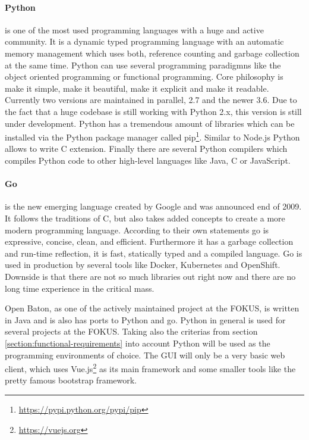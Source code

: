 \paragraph{Python} is one of the most used programming languages with a huge and active community.\autocite[cf.]{ProgramminLanguage:2017}
It is a dynamic typed programming language with an automatic memory management which uses both, reference counting and garbage collection at the same time.\autocite[cf.]{Python:GarbageCollection}
Python can use several programming paradigmns like the object oriented programming or functional programming.
Core philosophy is make it simple, make it beautiful, make it explicit and make it readable.
Currently two versions are maintained in parallel, 2.7 and the newer 3.6.
Due to the fact that a huge codebase is still working with Python 2.x, this version is still under development.\autocite[cf.]{Peterson:PythonReleaseSchedule}
Python has a tremendous amount of libraries which can be installed via the Python package manager called pip\footnote{\url{https://pypi.python.org/pypi/pip}}.
Similar to Node.js Python allows to write C extension.
Finally there are several Python compilers which compiles Python code to other high-level languages like Java, C or JavaScript.

\paragraph{Go} is the new emerging language created by Google and was announced end of 2009.
It follows the traditions of C, but also takes added concepts to create a more modern programming language.
According to their own statements go is expressive, concise, clean, and efficient.\autocite[cf.]{Go:Documentation}
Furthermore it has a garbage collection and run-time reflection, it is fast, statically typed and a compiled language.\autocite[cf.]{Go:Documentation}
Go is used in production by several tools like Docker, Kubernetes and OpenShift.
Downside is that there are not so much libraries out right now and there are no long time experience in the critical mass.

Open Baton, as one of the actively maintained project at the \ac{FOKUS}, is written in Java and is also has ports to Python and go.
Python in general is used for several projects at the \ac{FOKUS}.
Taking also the criterias from section \ref{section:functional-requirements} into account Python will be used as the  programming environments of choice.
The \ac{GUI} will only be a very basic web client, which uses Vue.js\footnote{\url{https://vuejs.org}} as its main framework and some smaller tools like the pretty famous bootstrap framework.


